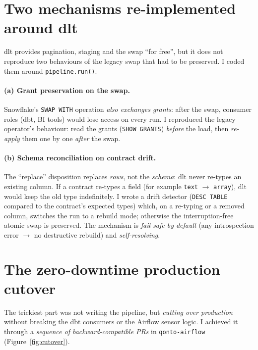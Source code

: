 \section{Two mechanisms re-implemented around dlt}

dlt provides pagination, staging and the swap ``for free'', but it does not reproduce two behaviours of the legacy swap that had to be preserved. I coded them around \texttt{pipeline.run()}.

\paragraph{(a) Grant preservation on the swap.} Snowflake's \texttt{SWAP WITH} operation \emph{also exchanges grants}: after the swap, consumer roles (dbt, BI tools) would lose access on every run. I reproduced the legacy operator's behaviour: read the grants (\texttt{SHOW GRANTS}) \emph{before} the load, then \emph{re-apply} them one by one \emph{after} the swap.

\paragraph{(b) Schema reconciliation on contract drift.} The ``replace'' disposition replaces \emph{rows}, not the \emph{schema}: dlt never re-types an existing column. If a contract re-types a field (for example \texttt{text} $\rightarrow$ \texttt{array}), dlt would keep the old type indefinitely. I wrote a drift detector (\texttt{DESC TABLE} compared to the contract's expected types) which, on a re-typing or a removed column, switches the run to a rebuild mode; otherwise the interruption-free atomic swap is preserved. The mechanism is \emph{fail-safe by default} (any introspection error $\rightarrow$ no destructive rebuild) and \emph{self-resolving}.

\section{The zero-downtime production cutover}

The trickiest part was not writing the pipeline, but \emph{cutting over production} without breaking the dbt consumers or the Airflow sensor logic. I achieved it through a \emph{sequence of backward-compatible PRs} in \texttt{qonto-airflow} (Figure~\ref{fig:cutover}).

